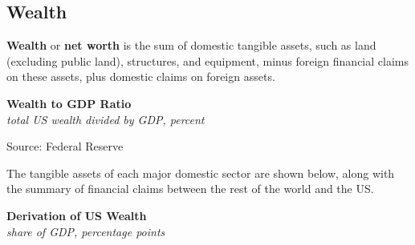 \documentclass{report}
\makeatletter
\newcommand{\tbllink}[1]{\href{https://raw.githubusercontent.com/bdecon/US-chartbook/master/chartbook/data/#1}{\faTable}}
\newcommand*\short[1]{\expandafter\@gobbletwo\number\numexpr#1\relax}
\newcommand{\sbar}[4]{
		\addplot[ybar stacked, bar width=2.3pt, draw opacity=0, fill=#1] 
			table [x=#2, y=#3, col sep=comma]{#4};}
\newcommand{\absnode}[3]{\node[below right, align=left] at (axis cs: #1,#2) {#3};}
\newcommand{\dateaxisticks}{
		date coordinates in=x, axis line style={draw=none},
		xmax={2024-01-31},
		max space between ticks=40,	    
		xtick={{1990-01-01}, {1992-01-01}, {1994-01-01}, 
			{1996-01-01}, {1998-01-01}, {2000-01-01}, 
			{2002-01-01}, {2004-01-01}, {2006-01-01},
			{2008-01-01}, {2010-01-01}, {2012-01-01}, {2014-01-01},
		    {2016-01-01}, {2018-01-01}, {2020-01-01}, {2022-01-01}, 
		    {2024-01-01}, {2026-01-01}},
		minor xtick={{1989-01-01}, {1991-01-01}, {1993-01-01},
			{1995-01-01}, {1997-01-01}, {1999-01-01}, 
			{2001-01-01}, {2003-01-01}, {2005-01-01}, {2007-01-01},
		    {2009-01-01}, {2011-01-01}, {2013-01-01}, {2015-01-01},
		    {2017-01-01}, {2019-01-01}, {2021-01-01}, {2023-01-01}, 
		    {2025-01-01}, {2027-01-01}},
		enlarge y limits={0.06}, enlarge x limits={0.01},
		xticklabel style={align=center, yshift=-2pt}, tick label style={inner sep=0pt},
		}
\newcommand{\bbar}[2]{extra #1 ticks = {{#2}}, extra #1 tick labels = ,
		extra #1 tick style = {grid=major, grid style={thick, black!25}},}
\newcommand{\rbars}{
		\fill[color=black!10] (axis cs:{1990-07-01},\pgfkeysvalueof{/pgfplots/ymin})
			rectangle (axis cs:{1991-03-01}, \pgfkeysvalueof{/pgfplots/ymax});
		\fill[color=black!10] (axis cs:{2007-12-01},\pgfkeysvalueof{/pgfplots/ymin})
			rectangle (axis cs:{2009-07-01}, \pgfkeysvalueof{/pgfplots/ymax});
		\fill[color=black!10] (axis cs:{2001-03-01},\pgfkeysvalueof{/pgfplots/ymin})
			rectangle (axis cs:{2001-11-01}, \pgfkeysvalueof{/pgfplots/ymax});
		\fill[color=black!10] (axis cs:{2020-02-01},\pgfkeysvalueof{/pgfplots/ymin})
			rectangle (axis cs:{2020-05-01}, \pgfkeysvalueof{/pgfplots/ymax});}
\makeatother
\begin{document}
{\begin{minipage}{1.0\textwidth}
\subsection*{Wealth} 
\hypertarget{ofw}{\label{ofw}}
\small \textbf{Wealth} or \textbf{net worth} is the sum of domestic tangible assets, such as land (excluding public land), structures, and equipment, minus foreign financial claims on these assets, plus domestic claims on foreign assets.   


\vspace{1mm}

\normalsize \textbf{Wealth to GDP Ratio}\\
\footnotesize{\textit{total US wealth divided by GDP, percent}}
\vspace{3.0cm}

\hspace{4mm} 

\footnotesize{Source: Federal Reserve} \hfill \tbllink{wealthgdp.csv}
\vspace{2mm}

\small The tangible assets of each major domestic sector are shown below, along with the summary of financial claims between the rest of the world and the US.
\vspace{1mm}

\normalsize \textbf{Derivation of US Wealth}\\
\footnotesize{\textit{share of GDP, percentage points}}
\vspace*{-6mm}


\end{minipage}}
\end{document}
